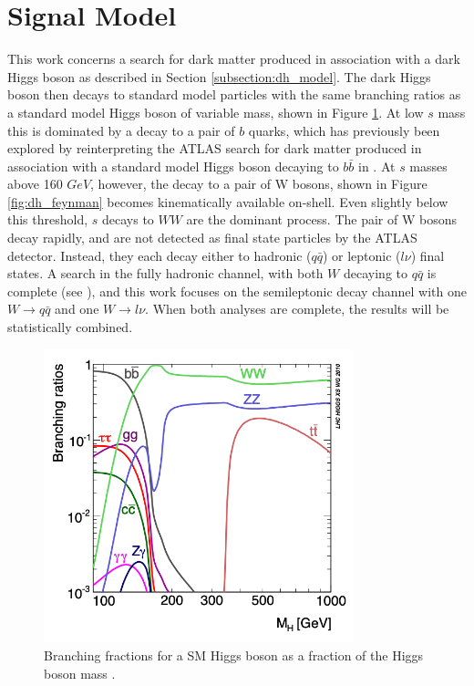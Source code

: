 \label{chapter:ana_prep}

\section{Signal Model}
This work concerns a search for dark matter produced in association with a dark Higgs boson as described in Section \ref{subsection:dh_model}.  The dark Higgs boson then decays to standard model particles with the same branching ratios as a standard model Higgs boson of variable mass, shown in Figure \ref{fig:HiggsBR}. At low $s$ mass this is dominated by a decay to a pair of $b$ quarks, which has previously been explored by reinterpreting the ATLAS search for dark matter produced in association with a standard model Higgs boson decaying to $b\bar{b}$ in \cite{monos_bb}. At $s$ masses above 160 $GeV$, however, the decay to a pair of W bosons, shown in Figure \ref{fig:dh_feynman} becomes kinematically available on-shell. Even slightly below this threshold, $s$ decays to $WW$ are the dominant process. The pair of W bosons decay rapidly, and are not detected as final state particles by the ATLAS detector. Instead, they each decay either to hadronic ($q\bar{q}$) or leptonic ($l\nu$) final states. A search in the fully hadronic channel, with both $W$ decaying to $q\bar{q}$ is complete (see \cite{had_analy}), and this work focuses on the semileptonic decay channel with one $ W \rightarrow q\bar{q} $ and one $ W \rightarrow l\nu $. When both analyses are complete, the results will be statistically combined.

\begin{figure}[H]
    \centering
    \includegraphics[width=0.8\textwidth]{Figures/3/HiggsBR.png}
    \caption{Branching fractions for a SM Higgs boson as a fraction of the Higgs boson mass \cite{Higgs_BR}.}
    \label{fig:HiggsBR}
\end{figure}

